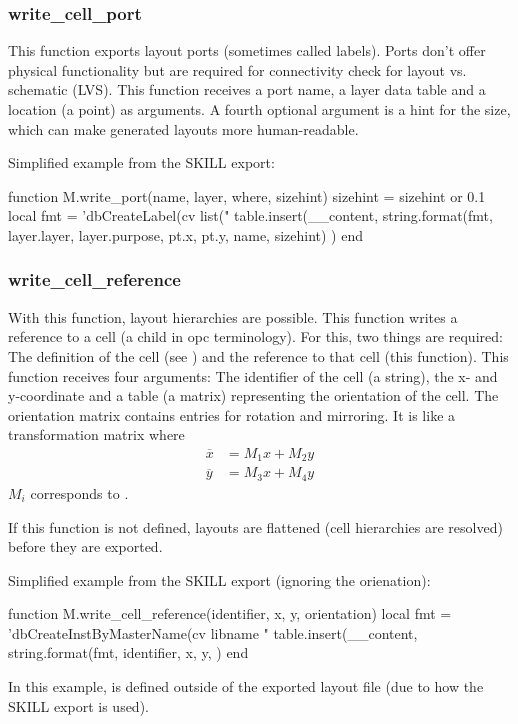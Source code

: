 \subsubsection{write\_cell\_port}
This function exports layout ports (sometimes called labels).
Ports don't offer physical functionality but are required for connectivity check for layout vs. schematic (LVS).
This function receives a port name, a layer data table and a location (a point) as arguments.
A fourth optional argument is a hint for the size, which can make generated layouts more human-readable.

Simplified example from the SKILL export:
\begin{lualisting}
    function M.write_port(name, layer, where, sizehint)
        sizehint = sizehint or 0.1
        local fmt = 'dbCreateLabel(cv list("%
        table.insert(__content, string.format(fmt,
            layer.layer, layer.purpose,
            pt.x, pt.y,
            name, sizehint)
        )
    end
\end{lualisting}

\subsubsection{write\_cell\_reference}
With this function, layout hierarchies are possible.
This function writes a reference to a cell (a child in opc terminology).
For this, two things are required:
The definition of the cell (see ) and the reference to that cell (this function).
This function receives four arguments:
The identifier of the cell (a string), the x- and y-coordinate and a table (a matrix) representing the orientation of the cell.
The orientation matrix contains entries for rotation and mirroring.
It is like a transformation matrix where
\begin{align*}
    \overbar{x} &= M_1 x + M_2 y \\
    \overbar{y} &= M_3 x + M_4 y
\end{align*}
$M_i$ corresponds to .

If this function is not defined, layouts are flattened (cell hierarchies are resolved) before they are exported.

Simplified example from the SKILL export (ignoring the orienation):
\begin{lualisting}
    function M.write_cell_reference(identifier, x, y, orientation)
        local fmt = 'dbCreateInstByMasterName(cv libname "%
        table.insert(__content, string.format(fmt,
            identifier,
            x, y,
        )
    end
\end{lualisting}
In this example,  is defined outside of the exported layout file (due to how the SKILL export is used).


